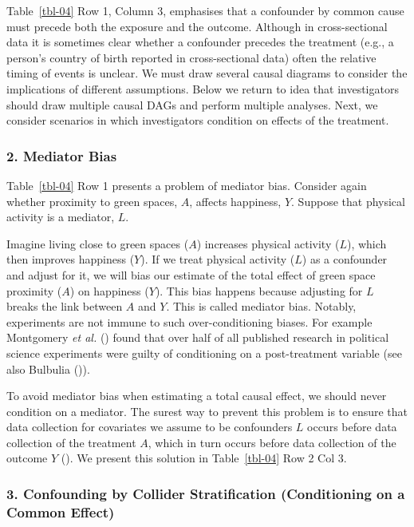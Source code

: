 \documentclass[
  singlecolumn]{article}
\begin{document}
Table~\ref{tbl-04} Row 1, Column 3, emphasises that a confounder by
common cause must precede both the exposure and the outcome. Although in
cross-sectional data it is sometimes clear whether a confounder precedes
the treatment (e.g., a person's country of birth reported in
cross-sectional data) often the relative timing of events is unclear. We
must draw several causal diagrams to consider the implications of
different assumptions. Below we return to idea that investigators should
draw multiple causal DAGs and perform multiple analyses. Next, we
consider scenarios in which investigators condition on effects of the
treatment.

\subsubsection{2. Mediator Bias}\label{mediator-bias}

Table~\ref{tbl-04} Row 1 presents a problem of mediator bias. Consider
again whether proximity to green spaces, \(A\), affects happiness,
\(Y\). Suppose that physical activity is a mediator, \(L\).

Imagine living close to green spaces (\(A\)) increases physical activity
(\(L\)), which then improves happiness (\(Y\)). If we treat physical
activity (\(L\)) as a confounder and adjust for it, we will bias our
estimate of the total effect of green space proximity (\(A\)) on
happiness (\(Y\)). This bias happens because adjusting for \(L\) breaks
the link between \(A\) and \(Y\). This is called mediator bias. Notably,
experiments are not immune to such over-conditioning biases. For example
Montgomery \emph{et al.} () found
that over half of all published research in political science
experiments were guilty of conditioning on a post-treatment variable
(see also Bulbulia ()).

To avoid mediator bias when estimating a total causal effect, we should
never condition on a mediator. The surest way to prevent this problem is
to ensure that data collection for covariates we assume to be
confounders \(L\) occurs before data collection of the treatment \(A\),
which in turn occurs before data collection of the outcome \(Y\)
(). We
present this solution in Table~\ref{tbl-04} Row 2 Col 3.

\subsubsection{3. Confounding by Collider Stratification (Conditioning
on a Common
Effect)}\label{confounding-by-collider-stratification-conditioning-on-a-common-effect}
\end{document}
